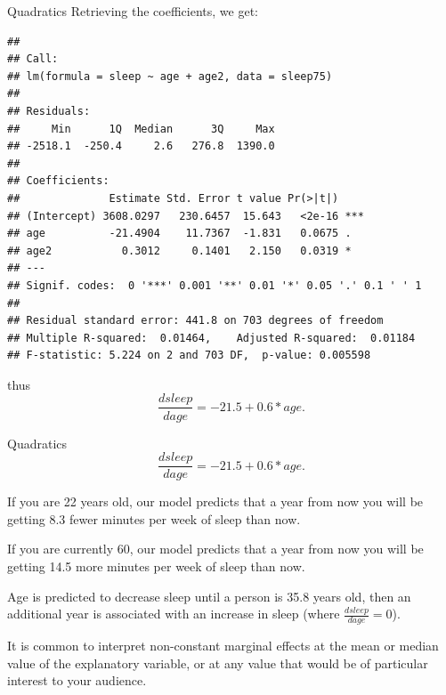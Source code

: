 \documentclass[
  ignorenonframetext,
]{beamer}
\newenvironment{Shaded}{\begin{snugshade}}{\end{snugshade}}
\newcommand{\FunctionTok}[1]{\textcolor[rgb]{0.00,0.00,0.00}{#1}}
\newcommand{\NormalTok}[1]{#1}
\newcommand{\OtherTok}[1]{\textcolor[rgb]{0.56,0.35,0.01}{#1}}
\newcommand{\SpecialCharTok}[1]{\textcolor[rgb]{0.00,0.00,0.00}{#1}}
\begin{document}
\begin{frame}[fragile]{Quadratics}
\protect\hypertarget{quadratics-3}{}
Retrieving the coefficients, we get:

\tiny

\begin{Shaded}
\end{Shaded}

\begin{verbatim}
## 
## Call:
## lm(formula = sleep ~ age + age2, data = sleep75)
## 
## Residuals:
##     Min      1Q  Median      3Q     Max 
## -2518.1  -250.4     2.6   276.8  1390.0 
## 
## Coefficients:
##              Estimate Std. Error t value Pr(>|t|)    
## (Intercept) 3608.0297   230.6457  15.643   <2e-16 ***
## age          -21.4904    11.7367  -1.831   0.0675 .  
## age2           0.3012     0.1401   2.150   0.0319 *  
## ---
## Signif. codes:  0 '***' 0.001 '**' 0.01 '*' 0.05 '.' 0.1 ' ' 1
## 
## Residual standard error: 441.8 on 703 degrees of freedom
## Multiple R-squared:  0.01464,    Adjusted R-squared:  0.01184 
## F-statistic: 5.224 on 2 and 703 DF,  p-value: 0.005598
\end{verbatim}

\normalsize

thus \[
\frac{dsleep}{dage}=-21.5+0.6*age.
\]
\end{frame}

\begin{frame}{Quadratics}
\protect\hypertarget{quadratics-4}{}
\[
\frac{dsleep}{dage}=-21.5+0.6*age.
\]

If you are 22 years old, our model predicts that a year from now you
will be getting 8.3 fewer minutes per week of sleep than now.

If you are currently 60, our model predicts that a year from now you
will be getting 14.5 more minutes per week of sleep than now.

Age is predicted to decrease sleep until a person is 35.8 years old,
then an additional year is associated with an increase in sleep (where
\(\frac{dsleep}{dage}=0\)).

It is common to interpret non-constant marginal effects at the mean or
median value of the explanatory variable, or at any value that would be
of particular interest to your audience.
\end{frame}
\end{document}
